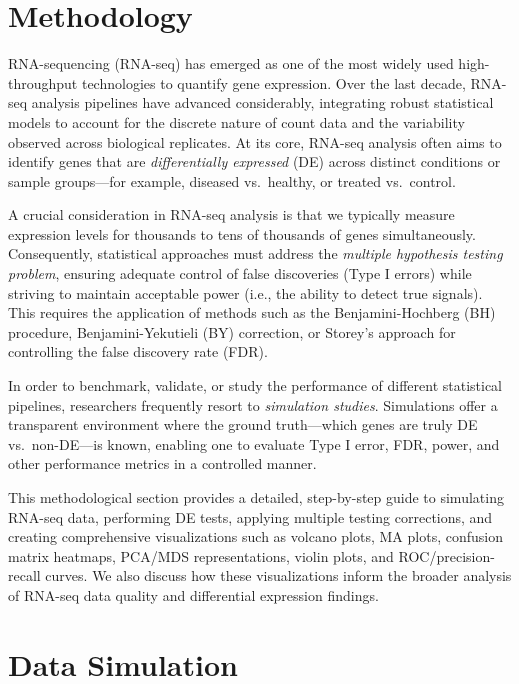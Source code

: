 \documentclass[12pt]{article}
\begin{document}
\section{Methodology}

RNA-sequencing (RNA-seq) has emerged as one of the most widely used high-throughput technologies to quantify gene expression. Over the last decade, RNA-seq analysis pipelines have advanced considerably, integrating robust statistical models to account for the discrete nature of count data and the variability observed across biological replicates. At its core, RNA-seq analysis often aims to identify genes that are \emph{differentially expressed} (DE) across distinct conditions or sample groups---for example, diseased vs.\ healthy, or treated vs.\ control. 

A crucial consideration in RNA-seq analysis is that we typically measure expression levels for thousands to tens of thousands of genes simultaneously. Consequently, statistical approaches must address the \emph{multiple hypothesis testing problem}, ensuring adequate control of false discoveries (Type I errors) while striving to maintain acceptable power (i.e., the ability to detect true signals). This requires the application of methods such as the Benjamini-Hochberg (BH) procedure, Benjamini-Yekutieli (BY) correction, or Storey's approach for controlling the false discovery rate (FDR).

In order to benchmark, validate, or study the performance of different statistical pipelines, researchers frequently resort to \emph{simulation studies}. Simulations offer a transparent environment where the ground truth---which genes are truly DE vs.\ non-DE---is known, enabling one to evaluate Type I error, FDR, power, and other performance metrics in a controlled manner. 

This methodological section provides a detailed, step-by-step guide to simulating RNA-seq data, performing DE tests, applying multiple testing corrections, and creating comprehensive visualizations such as volcano plots, MA plots, confusion matrix heatmaps, PCA/MDS representations, violin plots, and ROC/precision-recall curves. We also discuss how these visualizations inform the broader analysis of RNA-seq data quality and differential expression findings.

\section{Data Simulation}
\label{sec:datasimulation}
\end{document}
